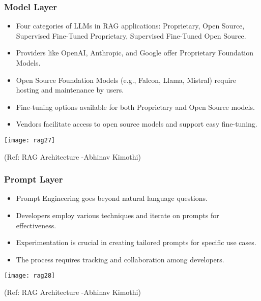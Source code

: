 \begin{frame}[fragile]\frametitle{Model Layer}
    \begin{itemize}
        \item Four categories of LLMs in RAG applications: Proprietary, Open Source, Supervised Fine-Tuned Proprietary, Supervised Fine-Tuned Open Source.
        \item Providers like OpenAI, Anthropic, and Google offer Proprietary Foundation Models.
        \item Open Source Foundation Models (e.g., Falcon, Llama, Mistral) require hosting and maintenance by users.
        \item Fine-tuning options available for both Proprietary and Open Source models.
        \item Vendors facilitate access to open source models and support easy fine-tuning.
    \end{itemize}
	
	\begin{center}
	\texttt{[image: rag27]}
	
	{\tiny (Ref: RAG Architecture -Abhinav  Kimothi)}
	\end{center}	
\end{frame}

\begin{frame}[fragile]\frametitle{Prompt Layer}
    \begin{itemize}
        \item Prompt Engineering goes beyond natural language questions.
        \item Developers employ various techniques and iterate on prompts for effectiveness.
        \item Experimentation is crucial in creating tailored prompts for specific use cases.
        \item The process requires tracking and collaboration among developers.
    \end{itemize}
	
	\begin{center}
	\texttt{[image: rag28]}
	
	{\tiny (Ref: RAG Architecture -Abhinav  Kimothi)}
	\end{center}		
\end{frame}

